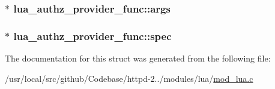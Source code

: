 \subsubsection[{\texorpdfstring{args}{args}}]{$\ast$ lua\+\_\+authz\+\_\+provider\+\_\+func\+::args}\hypertarget{structlua__authz__provider__func_a4567a8636199bce9da85068308f175e9}{}\label{structlua__authz__provider__func_a4567a8636199bce9da85068308f175e9}
\subsubsection[{\texorpdfstring{spec}{spec}}]{$\ast$ lua\+\_\+authz\+\_\+provider\+\_\+func\+::spec}\hypertarget{structlua__authz__provider__func_af79edbeacc9a56520aa47a2b9324fd39}{}\label{structlua__authz__provider__func_af79edbeacc9a56520aa47a2b9324fd39}


The documentation for this struct was generated from the following file\+:\begin{DoxyCompactItemize}
\item 
/usr/local/src/github/\+Codebase/httpd-\/2../modules/lua/\hyperlink{mod__lua_8c}{mod\+\_\+lua.\+c}\end{DoxyCompactItemize}
